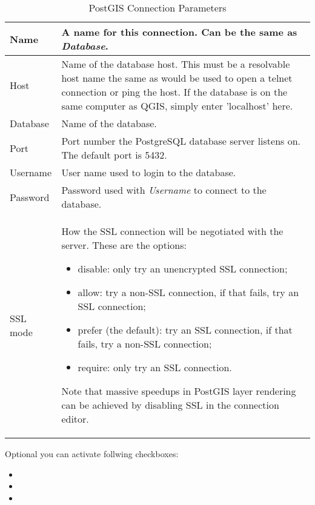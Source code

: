 \begin{table}[ht]
\centering
\caption{PostGIS Connection
Parameters}\label{tab:postgis_connection_parms}\medskip
 \begin{tabular}{|l|p{5in}|}
\hline Name & A name for this connection. Can be the same as \textsl{Database}.
\\
\hline Host \index{PostgreSQL!host}
& Name of the database host. This must be a resolvable host name the same as
would be used to open a telnet connection or ping the host. If the database is 
on the same computer as QGIS, simply enter 'localhost' here. \\
\hline Database \index{PostgreSQL!database} & Name of the database.  \\
\hline Port \index{PostgreSQL!port}& Port number the PostgreSQL database
server listens on. The default port is 5432.\\
\hline Username \index{PostgreSQL!username}& User name used to login to the
database. \\
\hline Password \index{PostgreSQL!password}& Password used with
\textsl{Username} to connect to the database.\\
\hline SSL mode \index{PostgreSQL!sslmode}& How the SSL connection will be negotiated with the server. These are the options: 
\begin {itemize}
\item disable: only try an unencrypted SSL connection;
\item allow: try a non-SSL connection, if that fails, try an SSL connection;
\item prefer (the default): try an SSL connection, if that fails, try a non-SSL connection;
\item require: only try an SSL connection.
\end {itemize}
Note that massive speedups in PostGIS layer rendering can be achieved by disabling SSL in the connection editor. \\
\hline
\end{tabular}
\end{table}

Optional you can activate follwing checkboxes:

\begin{itemize}[label=--]
\item {}
\item {}
\item {}
\end{itemize}

